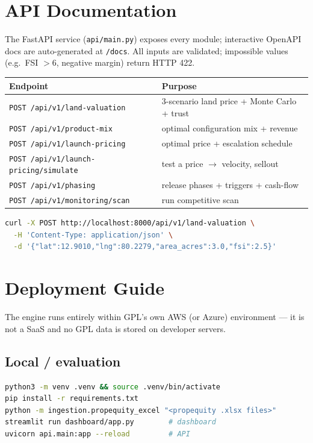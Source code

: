 \documentclass[11pt,a4paper]{article}
\begin{document}
\section{API Documentation}
The FastAPI service (\texttt{api/main.py}) exposes every module; interactive
OpenAPI docs are auto-generated at \texttt{/docs}. All inputs are validated;
impossible values (e.g.\ FSI $>6$, negative margin) return HTTP 422.

\begin{longtable}{p{5.5cm} p{7cm}}
\toprule
\textbf{Endpoint} & \textbf{Purpose} \\
\midrule
\texttt{POST /api/v1/land-valuation} & 3-scenario land price + Monte Carlo + trust \\
\texttt{POST /api/v1/product-mix} & optimal configuration mix + revenue \\
\texttt{POST /api/v1/launch-pricing} & optimal price + escalation schedule \\
\texttt{POST /api/v1/launch-pricing/simulate} & test a price $\rightarrow$ velocity, sellout \\
\texttt{POST /api/v1/phasing} & release phases + triggers + cash-flow \\
\texttt{POST /api/v1/monitoring/scan} & run competitive scan \\
\bottomrule
\end{longtable}

\begin{lstlisting}[language=bash, caption={Example request.}]
curl -X POST http://localhost:8000/api/v1/land-valuation \
  -H 'Content-Type: application/json' \
  -d '{"lat":12.9010,"lng":80.2279,"area_acres":3.0,"fsi":2.5}'
\end{lstlisting}

\section{Deployment Guide}
The engine runs entirely within GPL's own AWS (or Azure) environment --- it is
not a SaaS and no GPL data is stored on developer servers.

\subsection{Local / evaluation}
\begin{lstlisting}[language=bash]
python3 -m venv .venv && source .venv/bin/activate
pip install -r requirements.txt
python -m ingestion.propequity_excel "<propequity .xlsx files>"
streamlit run dashboard/app.py        # dashboard
uvicorn api.main:app --reload         # API
\end{lstlisting}
\end{document}
